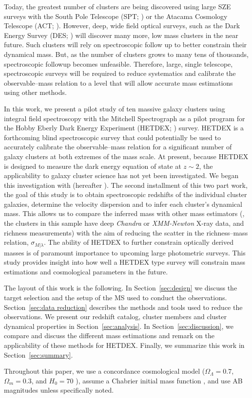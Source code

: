 Today, the greatest number of clusters are being discovered using large SZE surveys with the South Pole Telescope (SPT; \citealt{Carlstrom2011}) or the Atacama Cosmology Telescope (ACT; \citealt{Swetz2011}). However, deep, wide field optical surveys, such as the Dark Energy Survey (DES; \citealt{DES2005}) will discover many more, low mass clusters in the near future. Such clusters will rely on spectroscopic follow up to better constrain their dynamical mass. But, as the number of clusters grows to many tens of thousands, spectroscopic followup becomes unfeasible. Therefore, large, single telescope, spectroscopic surveys will be required to reduce systematics and calibrate the observable--mass relation to a level that will allow accurate mass estimations using other methods.

In this work, we present a pilot study of ten massive galaxy clusters using integral field spectroscopy with the Mitchell Spectrograph as a pilot program for the Hobby Eberly Dark Energy Experiment (HETDEX; \citealt{Hill2008}) survey. HETDEX is a forthcoming blind spectroscopic survey that could potentially be used to accurately calibrate the observable--mass relation for a significant number of galaxy clusters at both extremes of the mass scale. At present, because HETDEX is designed to measure the dark energy equation of state at $z\sim2$, the applicability to galaxy cluster science has not yet been investigated. We began this investigation with \cite{Boada2016} (hereafter ). The second installment of this two part work, the goal of this study is to obtain spectroscopic redshifts of the individual cluster galaxies, determine the velocity dispersion and to infer each cluster's dynamical mass. This allows us to compare the inferred mass with other mass estimators (\eg, the clusters in this sample have deep \textit{Chandra} or \textit{XMM-Newton} X-ray data, and richness measurements) with the aim of reducing the scatter in the richness--mass relation, $\sigma_{M|\lambda}$. The ability of HETDEX to further constrain optically derived masses is of paramount importance to upcoming large photometric surveys. This study provides insight into how well a HETDEX type survey will constrain mass estimations and cosmological parameters in the future.

The layout of this work is the following. In Section~\ref{sec:design} we discuss the target selection and the setup of the MS used to conduct the observations. Section~\ref{sec:data reduction} describes the methods and tools used to reduce the observations. We present our redshift catalog, cluster members and cluster dynamical properties in Section~\ref{sec:analysis}. In Section~\ref{sec:discussion}, we compare and discuss the different mass estimations and remark on the applicability of these methods for HETDEX. Finally, we summarize this work in Section~\ref{sec:summary}.

Throughout this paper, we use a concordance cosmological model ($\Omega_\Lambda = 0.7$, $\Omega_m = 0.3$, and $H_0= 70$ \kms \mpc), assume a Chabrier initial mass function \citep{Chabrier2003}, and use AB magnitudes \citep{Oke1974} unless specifically noted.
